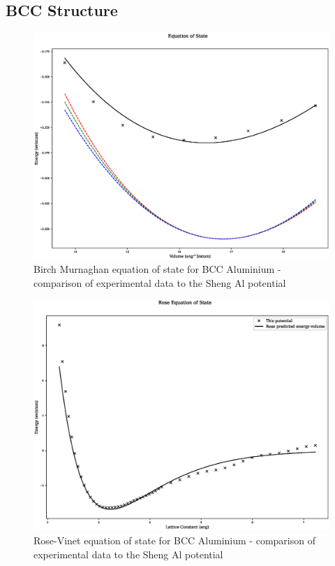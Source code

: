 \FloatBarrier
\subsection{BCC Structure}

\begin{figure}
  \begin{center}
    \includegraphics[width=0.6\linewidth]{appendix/transferability/transferability/Al_sheng/equation_of_state_bp_bcc.eps}
  \end{center}
	\caption{Birch Murnaghan equation of state for BCC Aluminium - comparison of experimental data to the Sheng Al potential}
	\label{fig:shengalfccbm}
\end{figure}

\begin{figure}
  \begin{center}
    \includegraphics[width=0.6\linewidth]{appendix/transferability/transferability/Al_sheng/rose_plot_bp_bcc.eps}
  \end{center}
	\caption{Rose-Vinet equation of state for BCC Aluminium - comparison of experimental data to the Sheng Al potential}
	\label{fig:shengalfccbm}
\end{figure}










